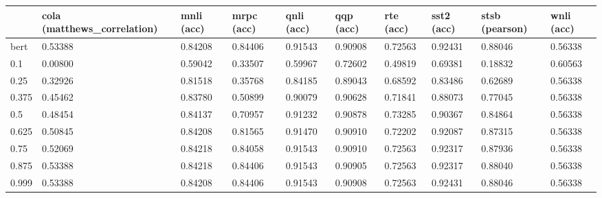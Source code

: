 \begin{tabular}{llllllllll}
\toprule
{} & cola (matthews\_correlation) &        mnli (acc) &        mrpc (acc) &        qnli (acc) &         qqp (acc) &         rte (acc) &        sst2 (acc) &    stsb (pearson) &        wnli (acc) \\
\midrule
bert                  &                     0.53388 &           0.84208 &           0.84406 &           0.91543 &           0.90908 &           0.72563 &           0.92431 &           0.88046 &           0.56338 \\
0.1                   &                     0.00800 &           0.59042 &           0.33507 &           0.59967 &           0.72602 &           0.49819 &           0.69381 &           0.18832 &           0.60563 \\
0.25                  &                     0.32926 &           0.81518 &           0.35768 &           0.84185 &           0.89043 &           0.68592 &           0.83486 &           0.62689 &           0.56338 \\
0.375                 &                     0.45462 &           0.83780 &           0.50899 &           0.90079 &           0.90628 &           0.71841 &           0.88073 &           0.77045 &           0.56338 \\
0.5                   &                     0.48454 &           0.84137 &           0.70957 &           0.91232 &           0.90878 &           0.73285 &           0.90367 &           0.84864 &           0.56338 \\
0.625                 &                     0.50845 &           0.84208 &           0.81565 &           0.91470 &           0.90910 &           0.72202 &           0.92087 &           0.87315 &           0.56338 \\
0.75                  &                     0.52069 &           0.84218 &           0.84058 &           0.91543 &           0.90910 &           0.72563 &           0.92317 &           0.87936 &           0.56338 \\
0.875                 &                     0.53388 &           0.84218 &           0.84406 &           0.91543 &           0.90905 &           0.72563 &           0.92317 &           0.88040 &           0.56338 \\
0.999                 &                     0.53388 &           0.84208 &           0.84406 &           0.91543 &           0.90908 &           0.72563 &           0.92431 &           0.88046 &           0.56338 \\

\end{tabular}

